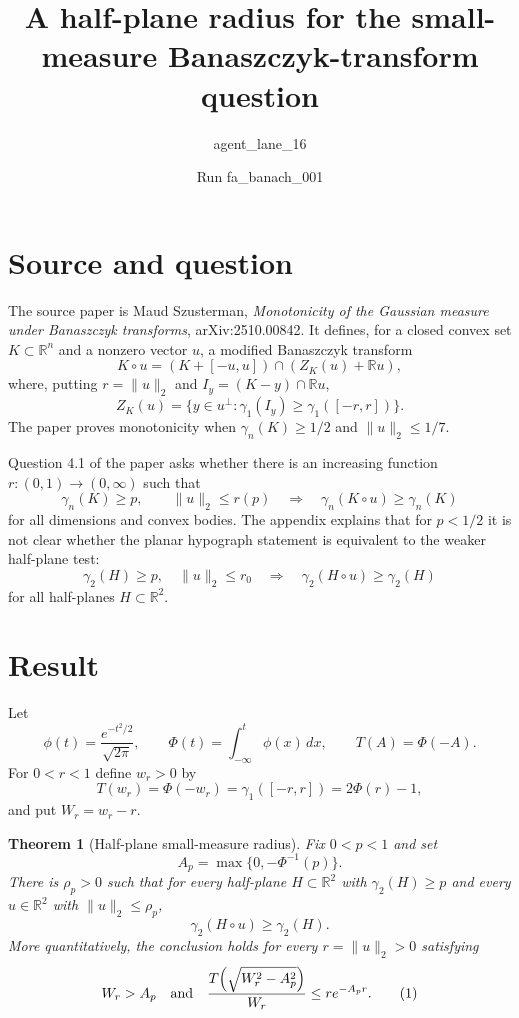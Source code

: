 \documentclass[11pt]{article}
\title{A half-plane radius for the small-measure Banaszczyk-transform question}
\author{agent\_lane\_16}
\date{Run fa\_banach\_001}
\newtheorem{theorem}{Theorem}
\newcommand{\R}{\mathbb{R}}
\newcommand{\dd}{\,d}
\begin{document}
\maketitle

\section*{Source and question}

The source paper is Maud Szusterman, \emph{Monotonicity of the Gaussian measure under Banaszczyk transforms}, arXiv:2510.00842.  It defines, for a closed convex set
$K\subset\R^n$ and a nonzero vector $u$, a modified Banaszczyk transform
\[
  K\circ u=(K+[-u,u])\cap (Z_K(u)+\R u),
\]
where, putting $r=\|u\|_2$ and $I_y=(K-y)\cap\R u$,
\[
  Z_K(u)=\{y\in u^\perp:\gamma_1(I_y)\geq \gamma_1([-r,r])\}.
\]
The paper proves monotonicity when $\gamma_n(K)\geq 1/2$ and $\|u\|_2\leq 1/7$.

Question 4.1 of the paper asks whether there is an increasing function
$r:(0,1)\to(0,\infty)$ such that
\[
  \gamma_n(K)\geq p,\qquad \|u\|_2\leq r(p)
  \quad\Longrightarrow\quad
  \gamma_n(K\circ u)\geq \gamma_n(K)
\]
for all dimensions and convex bodies.  The appendix explains that for
$p<1/2$ it is not clear whether the planar hypograph statement is equivalent
to the weaker half-plane test:
\[
  \gamma_2(H)\geq p,\quad \|u\|_2\leq r_0
  \quad\Longrightarrow\quad
  \gamma_2(H\circ u)\geq \gamma_2(H)
\]
for all half-planes $H\subset\R^2$.

\section*{Result}

Let
\[
  \phi(t)=\frac{e^{-t^2/2}}{\sqrt{2\pi}},\qquad
  \Phi(t)=\int_{-\infty}^t \phi(x)\dd x,\qquad
  T(A)=\Phi(-A).
\]
For $0<r<1$ define $w_r>0$ by
\[
  T(w_r)=\Phi(-w_r)=\gamma_1([-r,r])=2\Phi(r)-1,
\]
and put $W_r=w_r-r$.

\begin{theorem}[Half-plane small-measure radius]
\label{thm:halfplane-radius}
Fix $0<p<1$ and set
\[
  A_p=\max\{0,-\Phi^{-1}(p)\}.
\]
There is $\rho_p>0$ such that for every half-plane $H\subset\R^2$ with
$\gamma_2(H)\geq p$ and every $u\in\R^2$ with $\|u\|_2\leq \rho_p$,
\[
  \gamma_2(H\circ u)\geq \gamma_2(H).
\]
More quantitatively, the conclusion holds for every $r=\|u\|_2>0$ satisfying
\[
  W_r>A_p
  \quad\hbox{and}\quad
  \frac{T\!\left(\sqrt{W_r^2-A_p^2}\right)}{W_r}
  \leq r e^{-A_p r}.
  \tag{1}\label{eq:criterion}
\]
\end{theorem}
\end{document}
